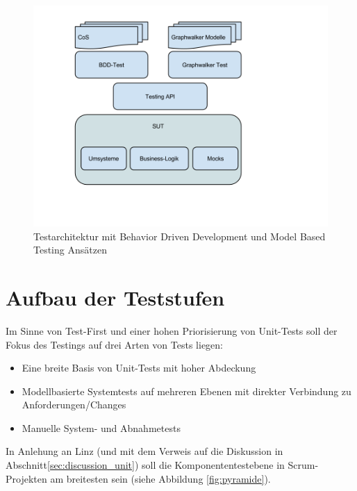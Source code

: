 \begin{figure}[h] 
  \centering
     \includegraphics[width=1.0\textwidth]{figures/Testarchitektur-MBT-BDD-COS.png}
  \caption{Testarchitektur mit Behavior Driven Development und Model Based Testing Ansätzen}
  \label{fig:testarchitektur}
\end{figure}

\section{Aufbau der Teststufen}
Im Sinne von Test-First und einer hohen Priorisierung von Unit-Tests soll der Fokus des Testings auf drei Arten von Tests liegen:

\begin{itemize}
\item Eine breite Basis von Unit-Tests mit hoher Abdeckung
\item Modellbasierte Systemtests auf mehreren Ebenen mit direkter Verbindung zu Anforderungen/Changes
\item Manuelle System- und Abnahmetests
\end{itemize}

In Anlehung an Linz \cite{linz_testing_2014} (und mit dem Verweis auf die Diskussion in Abschnitt\ref{sec:discussion_unit}) soll die Komponententestebene in Scrum-Projekten am breitesten sein (siehe Abbildung \ref{fig:pyramide}).

